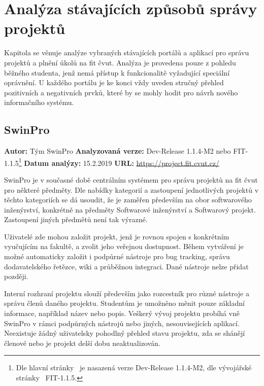 \chapter{Analýza stávajících způsobů správy projektů}

Kapitola se věnuje analýze vybraných stávajících portálů a aplikací pro správu projektů a plnění úkolů na \gls{fit} \gls{čvut}. Analýza je provedena pouze z pohledu běžného studenta, jenž nemá přístup k funkcionalitě vyžadující speciální oprávnění. U každého portálu je ke konci vždy uveden stručný přehled pozitivních a negativních prvků, které by se mohly hodit pro návrh nového informačního systému.




\section{SwinPro}

\textbf{Autor:} Tým SwinPro\newline
\textbf{Analyzovaná verze:} Dev-Release 1.1.4-M2 nebo FIT-1.1.5\footnote{Dle hlavní stránky~\cite{swinproHome} je nasazená verze Dev-Release 1.1.4-M2, dle vývojářské stránky~\cite{swinproDevpage} FIT-1.1.5.}\newline
\textbf{Datum analýzy:} 15.2.2019\newline
\textbf{URL:} \url{https://project.fit.cvut.cz/}

SwinPro je v současné době centrálním systémem pro správu projektů na \gls{fit} \gls{čvut} pro některé předměty. Dle nabídky kategorií a zastoupení jednotlivých projektů v těchto kategoriích se dá usoudit, že je zaměřen především na obor softwarového inženýrství, konkrétně na předměty Softwarové inženýrství a Softwarový projekt. Zastoupení jiných předmětů není tak výrazné.

Uživatelé zde mohou založit projekt, jenž je rovnou spojen s konkrétním vyučujícím na fakultě, a zvolit jeho veřejnou dostupnost. Během vytváření je možné automaticky založit i podpůrné nástroje pro bug tracking, správu dodavatelského řetězce, wiki a průběžnou integraci. Dané nástroje nelze přidat později.

Interní rozhraní projektu slouží především jako rozcestník pro různé nástroje a správu členů daného projektu. Studentům je umožněno měnit pouze základní informace, například název nebo popis. Veškerý vývoj projektu probíhá vně SwinPro v rámci podpůrných nástrojů nebo jiných, nesouvisejících aplikací. Neexistuje žádný uživatelsky pohodlný přehled stavu projektu, zda se shánějí členové nebo je projekt delší dobu neaktualizován.

